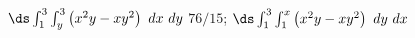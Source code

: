 {$\ds \int_{1}^{3}\int_{y}^{3}\left(x^2y-xy^2\right)\ dx\ dy$\label{13_02_ex_08}
}
{$76/15$; $\ds \int_{1}^{3}\int_{1}^{x}\left(x^2y-xy^2\right)\ dy\ dx$
}